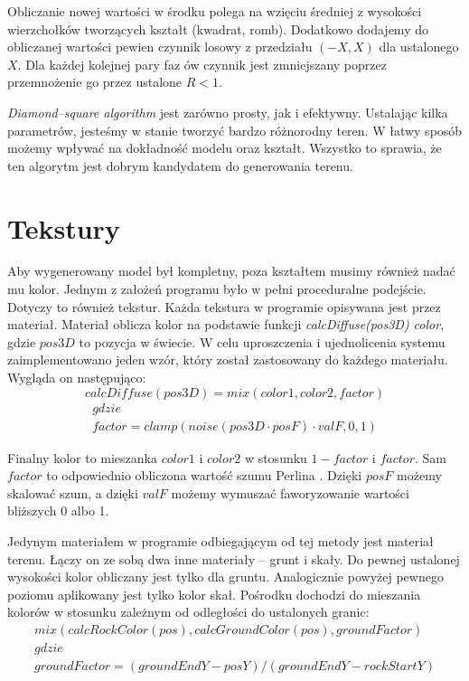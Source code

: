 \documentclass[inz,shortabstract]{iithesis}
\begin{document}
        Obliczanie nowej wartości w środku polega na wzięciu średniej z wysokości wierzchołków tworzących kształt (kwadrat, romb). Dodatkowo dodajemy do obliczanej wartości pewien czynnik losowy z przedziału $(-X, X)$ dla ustalonego $X$. Dla każdej kolejnej pary faz ów czynnik jest zmniejszany poprzez przemnożenie go przez ustalone $R < 1$.
        
        \textit{Diamond--square algorithm} jest zarówno prosty, jak i efektywny. Ustalając kilka parametrów, jesteśmy w stanie tworzyć bardzo różnorodny teren. W łatwy sposób możemy wpływać na dokładność modelu oraz kształt. Wszystko to sprawia, że ten algorytm jest dobrym kandydatem do generowania terenu.
        
    \section{Tekstury}
        Aby wygenerowany model był kompletny, poza kształtem musimy również nadać mu kolor. Jednym z założeń programu było w pełni proceduralne podejście. Dotyczy to również tekstur. Każda tekstura w programie opisywana jest przez materiał. Materiał oblicza kolor na podstawie funkcji \textit{calcDiffuse(pos3D) \textrightarrow color}, gdzie $pos3D$ to pozycja w świecie. W celu uproszczenia i ujednolicenia systemu zaimplementowano jeden wzór, który został zastosowany do każdego materiału. Wygląda on następująco:
        \begin{equation} \label{eqn:material}
            calcDiffuse(pos3D) = mix(color1, color2, factor)
        \end{equation}
        \begin{gather*}
            gdzie \\
            factor = clamp(noise(pos3D \cdot posF) \cdot valF, 0, 1)
        \end{gather*}
        

        Finalny kolor to mieszanka $color1$ i $color2$ w stosunku $1 - factor$ i $factor$. Sam $factor$ to odpowiednio obliczona wartość szumu Perlina \cite{perlinNoise}. Dzięki $posF$ możemy skalować szum, a dzięki $valF$ możemy wymuszać faworyzowanie wartości bliższych 0 albo 1.
        
        Jedynym materiałem w programie odbiegającym od tej metody jest materiał terenu. Łączy on ze sobą dwa inne materiały -- grunt i skały. Do pewnej ustalonej wysokości kolor obliczany jest tylko dla gruntu. Analogicznie powyżej pewnego poziomu aplikowany jest tylko kolor skał. Pośrodku dochodzi do mieszania kolorów w stosunku zależnym od odległości do ustalonych granic:
        \begin{gather*}
        mix(calcRockColor(pos), calcGroundColor(pos), groundFactor) \\
        gdzie \\
        groundFactor = (groundEndY - posY) / (groundEndY - rockStartY) \\
        \end{gather*}
        
\end{document}
